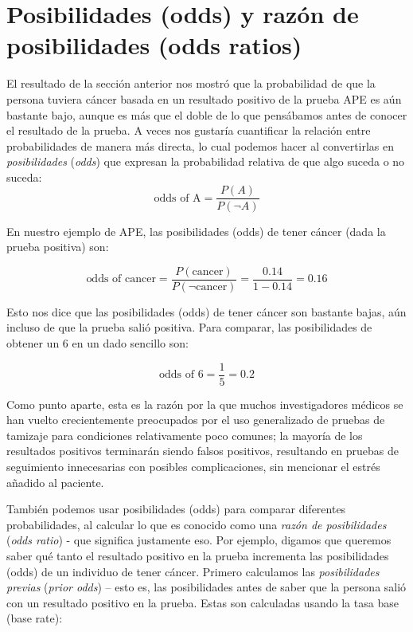 \documentclass[
  12pt,
]{book}
\theoremstyle{definition}
\theoremstyle{definition}
\theoremstyle{definition}
\theoremstyle{remark}
\begin{document}
\hypertarget{posibilidades-odds-y-razuxf3n-de-posibilidades-odds-ratios}{%
\section{Posibilidades (odds) y razón de posibilidades (odds ratios)}\label{posibilidades-odds-y-razuxf3n-de-posibilidades-odds-ratios}}

El resultado de la sección anterior nos mostró que la probabilidad de que la persona tuviera cáncer basada en un resultado positivo de la prueba APE es aún bastante bajo, aunque es más que el doble de lo que pensábamos antes de conocer el resultado de la prueba. A veces nos gustaría cuantificar la relación entre probabilidades de manera más directa, lo cual podemos hacer al convertirlas en \emph{posibilidades} (\emph{odds}) que expresan la probabilidad relativa de que algo suceda o no suceda:
\[
\text{odds of A} = \frac{P(A)}{P(\neg A)}
\]

En nuestro ejemplo de APE, las posibilidades (odds) de tener cáncer (dada la prueba positiva) son:

\[
\text{odds of cancer} = \frac{P(\text{cancer})}{P(\neg \text{cancer})} =\frac{0.14}{1 - 0.14} = 0.16
\]

Esto nos dice que las posibilidades (odds) de tener cáncer son bastante bajas, aún incluso de que la prueba salió positiva. Para comparar, las posibilidades de obtener un 6 en un dado sencillo son:

\[
\text{odds of 6} = \frac{1}{5} = 0.2
\]

Como punto aparte, esta es la razón por la que muchos investigadores médicos se han vuelto crecientemente preocupados por el uso generalizado de pruebas de tamizaje para condiciones relativamente poco comunes; la mayoría de los resultados positivos terminarán siendo falsos positivos, resultando en pruebas de seguimiento innecesarias con posibles complicaciones, sin mencionar el estrés añadido al paciente.

También podemos usar posibilidades (odds) para comparar diferentes probabilidades, al calcular lo que es conocido como una \emph{razón de posibilidades} (\emph{odds ratio}) - que significa justamente eso. Por ejemplo, digamos que queremos saber qué tanto el resultado positivo en la prueba incrementa las posibilidades (odds) de un individuo de tener cáncer. Primero calculamos las \emph{posibilidades previas} (\emph{prior odds}) -- esto es, las posibilidades antes de saber que la persona salió con un resultado positivo en la prueba. Estas son calculadas usando la tasa base (base rate):
\end{document}
